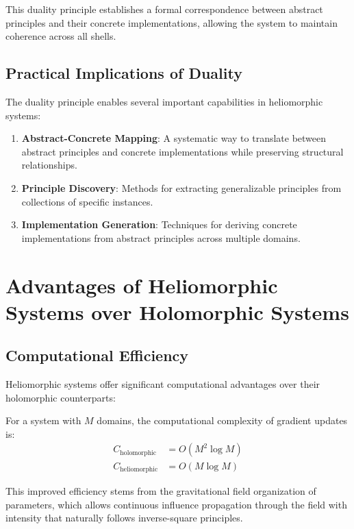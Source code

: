 This duality principle establishes a formal correspondence between abstract principles and their concrete implementations, allowing the system to maintain coherence across all shells.

\subsection{Practical Implications of Duality}

The duality principle enables several important capabilities in heliomorphic systems:

\begin{enumerate}
    \item \textbf{Abstract-Concrete Mapping}: A systematic way to translate between abstract principles and concrete implementations while preserving structural relationships.
    
    \item \textbf{Principle Discovery}: Methods for extracting generalizable principles from collections of specific instances.
    
    \item \textbf{Implementation Generation}: Techniques for deriving concrete implementations from abstract principles across multiple domains.
\end{enumerate}

\section{Advantages of Heliomorphic Systems over Holomorphic Systems}

\subsection{Computational Efficiency}

Heliomorphic systems offer significant computational advantages over their holomorphic counterparts:

\begin{proposition}
For a system with $M$ domains, the computational complexity of gradient updates is:
\begin{align}
C_{\text{holomorphic}} &= O(M^2 \log M) \\
C_{\text{heliomorphic}} &= O(M \log M)
\end{align}
\end{proposition}

This improved efficiency stems from the gravitational field organization of parameters, which allows continuous influence propagation through the field with intensity that naturally follows inverse-square principles.

